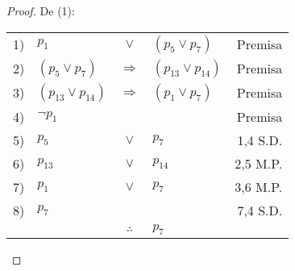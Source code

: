\documentclass[12pt]{report}
\theoremstyle{largebreak}
\begin{document}
    \begin{proof}
        De (1):
        \begin{center}
            \begin{tabular}{l l c l r}
                1) & $p_1$ & $\lor$ & $(p_5\lor p_7)$ & Premisa \\
                2) & $(p_5\lor p_7)$ & $\Rightarrow$ & $(p_{13}\lor p_{14})$ & Premisa \\
                3) & $(p_{13}\lor p_{14})$ & $\Rightarrow$ & $(p_{1}\lor p_{7})$ & Premisa \\
                4) & $\neg p_1$ &  &  & Premisa \\
                5) & $p_5$ & $\lor$ & $p_7$ & 1,4 S.D. \\
                6) & $p_{13}$ & $\lor$ & $p_{14}$ & 2,5 M.P.\\
                7) & $p_{1}$ & $\lor$ & $p_7$ & 3,6 M.P. \\
                8) & $p_{7}$ &  &  & 7,4 S.D.\\
                \hline
                & & $\therefore$ & $p_7$ & \\
            \end{tabular}
        \end{center}


\end{proof}
\end{document}
